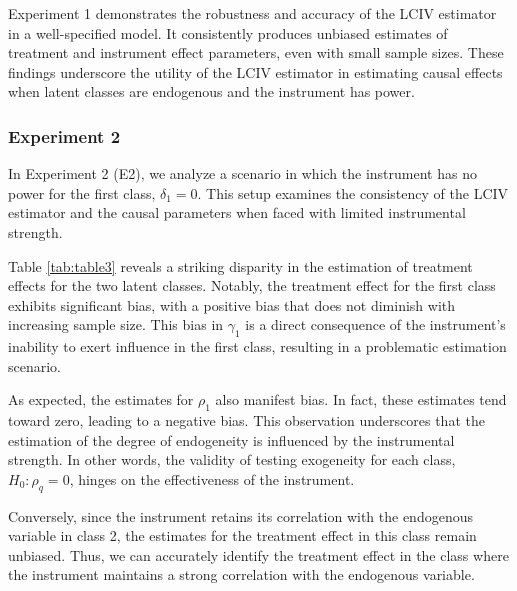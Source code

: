 \documentclass[12pt]{article}
\begin{document}
Experiment 1 demonstrates the robustness and accuracy of the LCIV estimator in a well-specified model. It consistently produces unbiased estimates of treatment and instrument effect parameters, even with small sample sizes. These findings underscore the utility of the LCIV estimator in estimating causal effects when latent classes are endogenous and the instrument has power.

\subsubsection{Experiment 2}

In Experiment 2 (E2), we analyze a scenario in which the instrument has no power for the first class, $\delta_1 = 0$. This setup examines the consistency of the LCIV estimator and the causal parameters when faced with limited instrumental strength.

Table \ref{tab:table3} reveals a striking disparity in the estimation of treatment effects for the two latent classes. Notably, the treatment effect for the first class exhibits significant bias, with a positive bias that does not diminish with increasing sample size. This bias in $\gamma_1$ is a direct consequence of the instrument's inability to exert influence in the first class, resulting in a problematic estimation scenario.

As expected, the estimates for $\rho_1$ also manifest bias. In fact, these estimates tend toward zero, leading to a negative bias. This observation underscores that the estimation of the degree of endogeneity is influenced by the instrumental strength. In other words, the validity of testing exogeneity for each class, $H_0: \rho_q = 0$, hinges on the effectiveness of the instrument.

Conversely, since the instrument retains its correlation with the endogenous variable in class 2, the estimates for the treatment effect in this class remain unbiased. Thus, we can accurately identify the treatment effect in the class where the instrument maintains a strong correlation with the endogenous variable.


\end{document}
